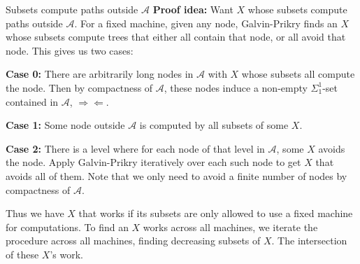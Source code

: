 \begin{frame}[shrink=10]{Subsets compute paths outside $\mathcal{A}$}
  \textbf{Proof idea:} Want $X$ whose subsets compute paths outside
  $\mathcal{A}$. For a fixed machine, given any node, Galvin-Prikry finds
  an $X$ whose subsets compute trees that either all contain that node, or
  all avoid that node. This gives us two cases:

  \vspace{1em}
  \textbf{Case 0:} There are arbitrarily long nodes in $\mathcal{A}$ with
  $X$ whose subsets all compute the node. Then by compactness of
  $\mathcal{A}$, these nodes induce a non-empty $\Sigma_1^1$-set contained
  in $\mathcal{A}$, $\Rightarrow\Leftarrow$.

  \vspace{0.5em}
  \textbf{Case 1:} Some node outside $\mathcal{A}$ is computed by all
  subsets of some $X$.

  \vspace{0.5em}
  \textbf{Case 2:} There is a level where for each node of that level in
  $\mathcal{A}$, some $X$ avoids the node. Apply Galvin-Prikry iteratively
  over each such node to get $X$ that avoids all of them. Note that we
  only need to avoid a finite number of nodes by compactness of
  $\mathcal{A}$.

  \vspace{1em}
  Thus we have $X$ that works if its subsets are only allowed to use a
  fixed machine for computations. To find an $X$ works across all machines,
  we iterate the procedure across all machines, finding decreasing subsets
  of $X$. The intersection of these $X$'s work.


\end{frame}

